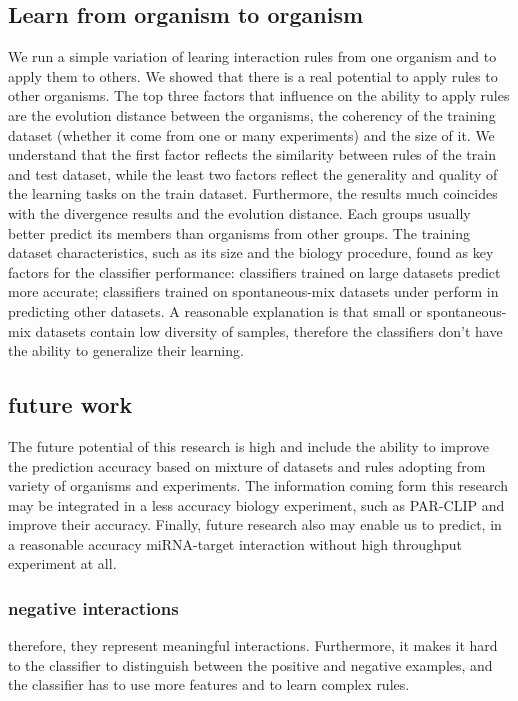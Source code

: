 \documentclass{bmcart}
\begin{document}
\subsection*{Learn from organism to organism}
We run a simple variation of learing interaction rules from one organism and to apply them to others. We showed that there is a real potential to apply rules to other organisms. The top three factors that influence on the ability to apply rules are the evolution distance between the organisms, the coherency of the training dataset (whether it come from one or many experiments) and the size of it. We understand that the first factor reflects the similarity between rules of the train and test dataset, while the least two factors reflect the generality and quality of the learning tasks on the train dataset.
Furthermore, the results much coincides with the divergence results and the evolution distance. Each groups usually better predict its members than organisms from other groups. The training dataset characteristics, such as its size and the biology procedure, found as key factors for the classifier performance: classifiers trained on large datasets predict more accurate;  classifiers trained on spontaneous-mix datasets under perform in predicting other datasets. A reasonable explanation is that small or spontaneous-mix datasets contain low diversity of samples, therefore the classifiers don't have the ability to generalize their learning.


\subsection*{future work}
The future potential of this research is high and include the ability to improve the prediction accuracy based on mixture of datasets and rules adopting from variety of organisms and experiments. The information coming form this research may be integrated in a less accuracy biology experiment, such as PAR-CLIP and improve their accuracy. Finally, future research also may enable us to predict, in a reasonable accuracy miRNA-target interaction without high throughput experiment at all.




\subsubsection{negative interactions}
 therefore, they represent meaningful interactions. Furthermore, it makes it hard to the classifier to distinguish between the positive and negative examples, and the classifier has to use more features and to learn complex rules.
\end{document}
